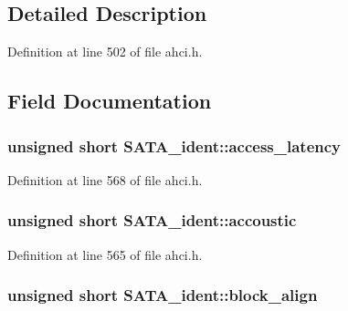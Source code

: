 \subsection{Detailed Description}


Definition at line 502 of file ahci.\+h.



\subsection{Field Documentation}
\subsubsection[{\texorpdfstring{access\+\_\+latency}{access_latency}}]{\setlength{\rightskip}{0pt plus 5cm}unsigned short S\+A\+T\+A\+\_\+ident\+::access\+\_\+latency}\hypertarget{structSATA__ident_ab0d4a28726318540f1a23cb47e71a682}{}\label{structSATA__ident_ab0d4a28726318540f1a23cb47e71a682}


Definition at line 568 of file ahci.\+h.

\subsubsection[{\texorpdfstring{accoustic}{accoustic}}]{\setlength{\rightskip}{0pt plus 5cm}unsigned short S\+A\+T\+A\+\_\+ident\+::accoustic}\hypertarget{structSATA__ident_ab35db051cb2210e01f0a316e61b90c76}{}\label{structSATA__ident_ab35db051cb2210e01f0a316e61b90c76}


Definition at line 565 of file ahci.\+h.

\subsubsection[{\texorpdfstring{block\+\_\+align}{block_align}}]{\setlength{\rightskip}{0pt plus 5cm}unsigned short S\+A\+T\+A\+\_\+ident\+::block\+\_\+align}\hypertarget{structSATA__ident_a7d3d9ee177c7fbdf752d10c4df81ce9f}{}\label{structSATA__ident_a7d3d9ee177c7fbdf752d10c4df81ce9f}


